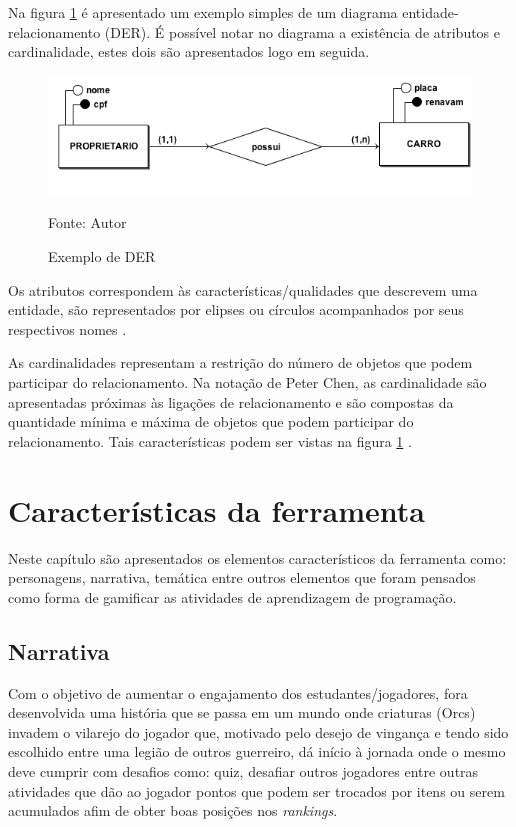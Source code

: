 Na figura \ref{figura1} é apresentado um exemplo simples de um diagrama entidade-relacionamento (DER). É possível notar 
no diagrama a existência de atributos e cardinalidade, estes dois são apresentados logo em seguida.

\begin{figure}[h]
	\centering
	\includegraphics[keepaspectratio=true,scale=0.5]{figuras/figura1.png}
	\caption{Exemplo de DER}
	Fonte: Autor
	\label{figura1}
\end{figure}

Os atributos correspondem às características/qualidades que descrevem uma entidade, são representados por
elipses ou círculos acompanhados por seus respectivos nomes \cite{sistemadebancos}.

As cardinalidades representam a restrição do número de objetos que podem participar do relacionamento. Na notação
de Peter Chen, as cardinalidade são apresentadas próximas às ligações de relacionamento e são compostas da quantidade
mínima e máxima de objetos que podem participar do relacionamento. Tais características podem ser vistas 
na figura \ref{figura1} \cite{sistemadebancos}.



\chapter{Características da ferramenta}

Neste capítulo são apresentados os elementos característicos da ferramenta como: personagens, narrativa, temática entre outros 
elementos que foram pensados como forma de gamificar as atividades de aprendizagem de programação.

\section{Narrativa}

Com o objetivo de aumentar o engajamento dos estudantes/jogadores, fora desenvolvida uma história que se passa em um mundo 
onde criaturas (Orcs) invadem o vilarejo do jogador que, motivado pelo desejo de vingança e tendo sido escolhido entre uma legião 
de outros guerreiro, dá início à jornada onde o mesmo deve cumprir com desafios como: quiz, desafiar outros jogadores entre outras
atividades que dão ao jogador pontos que podem ser trocados por itens ou serem acumulados afim de obter boas posições nos \textit{rankings}.

